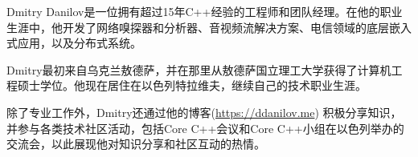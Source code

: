 Dmitry Danilov是一位拥有超过15年C++经验的工程师和团队经理。在他的职业生涯中，他开发了网络嗅探器和分析器、音视频流解决方案、电信领域的底层嵌入式应用，以及分布式系统。

Dmitry最初来自乌克兰敖德萨，并在那里从敖德萨国立理工大学获得了计算机工程硕士学位。他现在居住在以色列特拉维夫，继续自己的技术职业生涯。

除了专业工作外，Dmitry还通过他的博客(\url{https://ddanilov.me}) 积极分享知识，并参与各类技术社区活动，包括Core C++会议和Core C++小组在以色列举办的交流会，以此展现他对知识分享和社区互动的热情。
